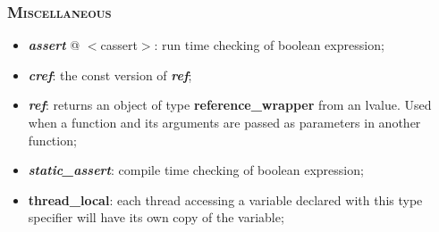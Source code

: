 \documentclass[10pt]{article}
\begin{document}
\begin{multicols*}{4}
{{\begin{itemize}[leftmargin=*,topsep=0.25pt]
\end{itemize}

\subsubsection*{\textsc{Miscellaneous}} 
\begin{itemize}[leftmargin=*,topsep=0.25pt]
  \setlength\itemsep{-1.8pt}
\item  \emph{\textbf{assert}} @ $<$cassert$>$: run time checking of boolean expression; 
\item  \emph{\textbf{cref}}: the const version of \emph{\textbf{ref}};
\item  \emph{\textbf{ref}}: returns an object of type \textbf{reference\_wrapper} from an lvalue. Used when a function and its arguments are passed as parameters in another function;
\item  \emph{\textbf{static\_assert}}: compile time checking of boolean expression;
\item  {\textbf{thread\_local}}: each thread accessing a variable declared with this type specifier will have its  own copy of the variable; 
\end{itemize}


}

}

 

\end{multicols*}
\end{document}
